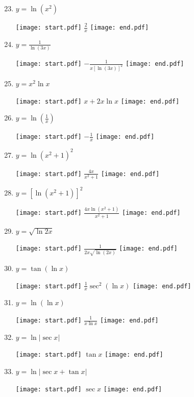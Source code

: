 \documentclass[12pt]{article}
\begin{document}
\begin{enumerate}
\setcounter{enumi}{22}

\item $y = \ln{(x^2)}$ 

\texttt{[image: start.pdf]}
{{$\frac{2}{x}$}}
\texttt{[image: end.pdf]}


\item $y = \frac{1}{\ln{(3x)}}$ 

\texttt{[image: start.pdf]}
{{$-\frac{1}{x[\ln{(3x)}]^2}$}}
\texttt{[image: end.pdf]}


\item $y = x^2\ln{x}$ 

\texttt{[image: start.pdf]}
{{$x+2x\ln{x}$}}
\texttt{[image: end.pdf]}


\item $y = \ln{\left(\frac{1}{x}\right)}$ 

\texttt{[image: start.pdf]}
{{$-\frac{1}{x}$}}
\texttt{[image: end.pdf]}


\item $y = \ln{(x^2+1)^2}$ 

\texttt{[image: start.pdf]}
{{$\frac{4x}{x^2+1}$}}
\texttt{[image: end.pdf]}


\item $y = \left[\ln{(x^2+1)}\right]^2$ 

\texttt{[image: start.pdf]}
{{$\frac{4x\ln{(x^2+1)}}{x^2+1}$}}
\texttt{[image: end.pdf]}


\item $y = \sqrt{\ln{2x}}$ 

\texttt{[image: start.pdf]}
{{$\frac{1}{2x\sqrt{\ln{(2x)}}}$}}
\texttt{[image: end.pdf]}


\item $y = \tan{(\ln{x})}$ 

\texttt{[image: start.pdf]}
{{$\frac{1}{x}\sec^{2}(\ln{x})$}}
\texttt{[image: end.pdf]}


\item $y = \ln{(\ln x)}$ 

\texttt{[image: start.pdf]}
{{$\frac{1}{x\ln{x}}$}}
\texttt{[image: end.pdf]}


\item $y=\ln{|\sec{x}|}$

\texttt{[image: start.pdf]}
{{$\tan{x}$}}
\texttt{[image: end.pdf]}


\item $y=\ln{|\sec{x}+\tan{x}|}$

\texttt{[image: start.pdf]}
{{$\sec{x}$}}
\texttt{[image: end.pdf]}



\end{enumerate}
\end{document}
